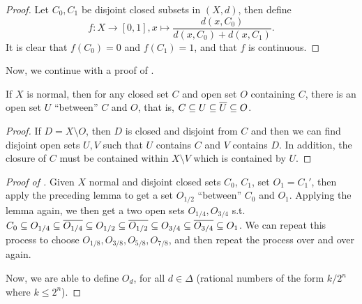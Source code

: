 \begin{proof}
    Let $C_0, C_1$ be disjoint closed subsets in $(X, d)$, then define \[f\colon X \to [0, 1], x \mapsto \frac{d(x, C_0)}{d(x, C_0) + d(x, C_1)}.\] It is clear that $f(C_0) = 0$ and $f(C_1) = 1$, and that $f$ is continuous.
\end{proof}

Now, we continue with a proof of .

\begin{lemma}
    If $X$ is normal, then for any closed set $C$ and open set $O$ containing $C$, there is an open set $U$ ``between'' $C$ and $O$, that is, $C \subseteq U \subseteq \overline U \subseteq O$.
\end{lemma}

\begin{proof}
    If $D = X \setminus O$, then $D$ is closed and disjoint from $C$ and then we can find disjoint open sets $U, V$ such that $U$ contains $C$ and $V$ contains $D$. In addition, the closure of $C$ must be contained within $X \setminus V$ which is contained by $U$. 
\end{proof}

\begin{proof}[Proof of ]
    Given $X$ normal and disjoint closed sets $C_0$, $C_1$, set $O_1 = C_1'$, then apply the preceding lemma to get a set $O_{1/2}$ ``between'' $C_0$ and $O_1$. Applying the lemma again, we then get a two open sets $O_{1/4}, O_{3/4}$ s.t. $C_0 \subseteq O_{1/4} \subseteq \overline{O_{1/4}} \subseteq O_{1/2} \subseteq \overline{O_{1/2}} \subseteq O_{3/4} \subseteq \overline{O_{3/4}} \subseteq O_1$. We can repeat this process to choose $O_{1/8}, O_{3/8}, O_{5/8}, O_{7/8}$, and then repeat the process over and over again.

    Now, we are able to define $O_{d}$, for all $d \in \Delta$ (rational numbers of the form $k/2^n$ where $k \le 2^n$).
\end{proof}